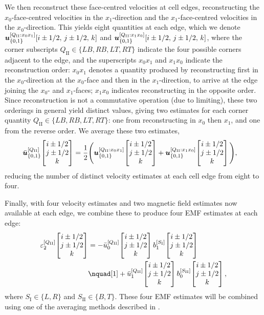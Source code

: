 We then reconstruct these face-centred velocities at cell edges, reconstructing the $x_0$-face-centred velocities in the $x_1$-direction and the $x_1$-face-centred velocities in the $x_0$-direction. This yields eight quantities at each edge, which we denote $\bm{u}_{\left\{ 0,1 \right\}}^{[Q_\mathrm{II}: x_0 x_1]}\!\left[ i \pm 1/2,\,j \pm 1/2,\,k \right]$ and $\bm{u}_{\left\{ 0,1 \right\}}^{[Q_\mathrm{II}: x_1 x_0]}\!\left[ i \pm 1/2,\,j \pm 1/2,\,k \right]$, where the corner subscripts $Q_\mathrm{II} \in \{LB, RB, LT, RT\}$ indicate the four possible corners adjacent to the edge, and the superscripts $x_0 x_1$ and $x_1 x_0$ indicate the reconstruction order: $x_0 x_1$ denotes a quantity produced by reconstructing first in the $x_0$-direction at the $x_0$-face and then in the $x_1$-direction, to arrive at the edge joining the $x_0$- and $x_1$-faces; $x_1 x_0$ indicates reconstructing in the opposite order. Since reconstruction is not a commutative operation (due to limiting), these two orderings in general yield distinct values, giving two estimates for each corner quantity $Q_\mathrm{II} \in \{LB, RB, LT, RT\}$: one from reconstructing in $x_0$ then $x_1$, and one from the reverse order. We average these two estimates,
\begin{align}
    \bar{\bm{u}}_{\left\{ 0,1 \right\}}^{[Q_\mathrm{II}]}\!\begin{bmatrix}i \pm 1/2\\j \pm 1/2\\k\end{bmatrix}
        &= \frac{1}{2} \Bigg(
            \bm{u}_{\left\{ 0,1 \right\}}^{[Q_\mathrm{II}: x_0 x_1]}\!\begin{bmatrix}i \pm 1/2\\j \pm 1/2\\k\end{bmatrix}
            + \bm{u}_{\left\{ 0,1 \right\}}^{[Q_\mathrm{II}: x_1 x_0]}\!\begin{bmatrix}i \pm 1/2\\j \pm 1/2\\k\end{bmatrix}
        \Bigg)
    , \label{eqn:emf:fs18-average}
\end{align}
reducing the number of distinct velocity estimates at each cell edge from eight to four.

Finally, with four velocity estimates and two magnetic field estimates now available at each edge, we combine these to produce four EMF estimates at each edge:
\begin{align}
    \varepsilon_{2}^{[Q_\mathrm{II}]}\EvalAtV{i \pm 1/2}{j \pm 1/2}{k}
        &= -\bar{u}_{0}^{[Q_\mathrm{II}]}\EvalAtV{i \pm 1/2}{j \pm 1/2}{k}
            b_{1}^{[S_\mathrm{I}]}\EvalAtV{i \pm 1/2}{j \pm 1/2}{k}
        \nonumber \\
        &\nquad[1]
            + \bar{u}_{1}^{[Q_\mathrm{II}]}\EvalAtV{i \pm 1/2}{j \pm 1/2}{k}
            b_{0}^{[S_\mathrm{II}]}\EvalAtV{i \pm 1/2}{j \pm 1/2}{k}
    , \label{eqn:emf:fs18}
\end{align}
where $S_\mathrm{I} \in \{L, R\}$ and $S_\mathrm{II} \in \{B, T\}$. These four EMF estimates will be combined using one of the averaging methods described in .

